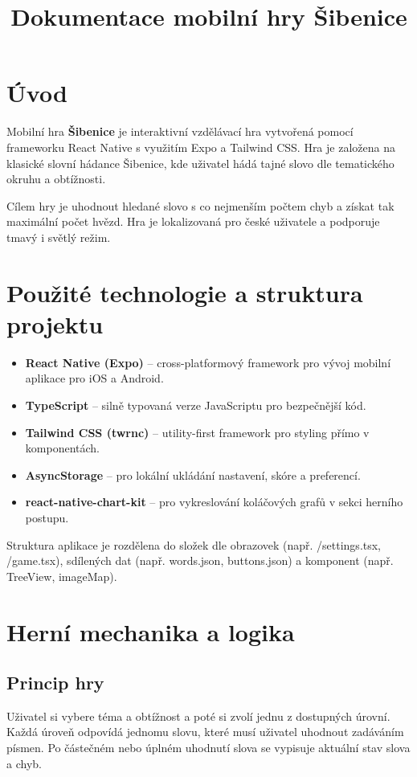 \documentclass[a4paper,12pt]{article}
\title{\textbf{Dokumentace mobilní hry Šibenice}}
\author{}
\date{}
\begin{document}
\maketitle

\section{Úvod}
Mobilní hra \textbf{Šibenice} je interaktivní vzdělávací hra vytvořená pomocí frameworku React Native s využitím Expo a Tailwind CSS. Hra je založena na klasické slovní hádance Šibenice, kde uživatel hádá tajné slovo dle tematického okruhu a obtížnosti.

Cílem hry je uhodnout hledané slovo s co nejmenším počtem chyb a získat tak maximální počet hvězd. Hra je lokalizovaná pro české uživatele a podporuje tmavý i světlý režim.

\section{Použité technologie a struktura projektu}

\begin{itemize}[leftmargin=*]
  \item \textbf{React Native (Expo)} – cross-platformový framework pro vývoj mobilní aplikace pro iOS a Android.
  \item \textbf{TypeScript} – silně typovaná verze JavaScriptu pro bezpečnější kód.
  \item \textbf{Tailwind CSS (twrnc)} – utility-first framework pro styling přímo v komponentách.
  \item \textbf{AsyncStorage} – pro lokální ukládání nastavení, skóre a preferencí.
  \item \textbf{react-native-chart-kit} – pro vykreslování koláčových grafů v sekci herního postupu.
\end{itemize}

Struktura aplikace je rozdělena do složek dle obrazovek (např. /settings.tsx, /game.tsx), sdílených dat (např. words.json, buttons.json) a komponent (např. TreeView, imageMap). 

\section{Herní mechanika a logika}

\subsection{Princip hry}
Uživatel si vybere téma a obtížnost a poté si zvolí jednu z dostupných úrovní. Každá úroveň odpovídá jednomu slovu, které musí uživatel uhodnout zadáváním písmen. Po částečném nebo úplném uhodnutí slova se vypisuje aktuální stav slova a chyb.
\end{document}
